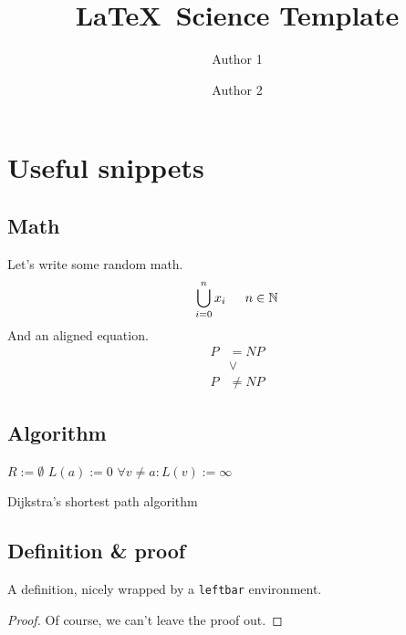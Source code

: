 \documentclass[a4paper]{article}
\begin{document}
	\title{\LaTeX\ Science Template}
	\author{Author 1 \and Author 2}
	\maketitle
	
	\pagebreak
	
	\tableofcontents
	\pagebreak
	
	\section{Useful snippets}
	
	\subsection{Math}
	Let's write some random math.
	\[ \bigcup_{i=0}^{n} x_i \indent n \in \mathbb{N} \]
	And an aligned equation.
	\begin{equation}
		\begin{split}
			P &= NP\\
			&\vee \\
			P&\neq NP
		\end{split}
	\end{equation}
	
	\subsection{Algorithm}
	\begin{algorithm}[H]
		$R:=\emptyset$\;
		$L(a):=0$\;
		$\forall v\neq a:L(v):=\infty$\;
		\caption{Dijkstra's shortest path algorithm}
	\end{algorithm}
	
	\subsection{Definition \& proof}
	\begin{leftbar}
		\begin{definition}
			A definition, nicely wrapped by a \texttt{leftbar} environment.
		\end{definition}
	\end{leftbar}
	\begin{proof}
		Of course, we can't leave the proof out.
	\end{proof}
	
\end{document}
